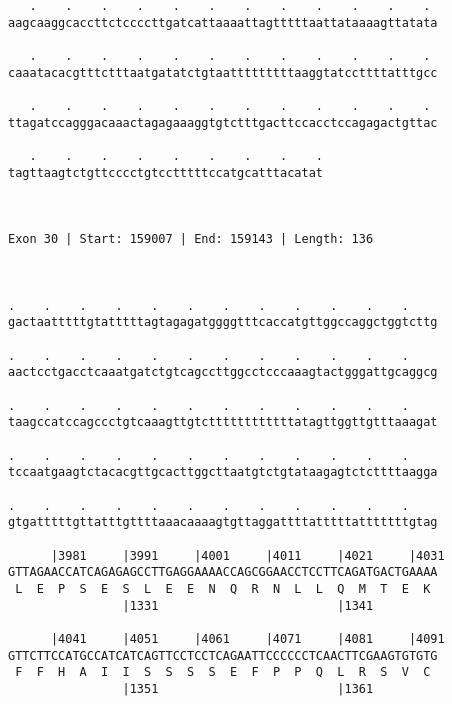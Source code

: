 \documentclass{article}
\begin{document}
\begin{Verbatim}
   .    .    .    .    .    .    .    .    .    .    .    . 
aagcaaggcaccttctccccttgatcattaaaattagtttttaattataaaagttatata
                                                            
   .    .    .    .    .    .    .    .    .    .    .    . 
caaatacacgtttctttaatgatatctgtaatttttttttaaggtatccttttatttgcc
                                                            
   .    .    .    .    .    .    .    .    .    .    .    . 
ttagatccagggacaaactagagaaaggtgtctttgacttccacctccagagactgttac
                                                            
   .    .    .    .    .    .    .    .    .
tagttaagtctgttcccctgtcctttttccatgcatttacatat
                                            
                                            
 
Exon 30 | Start: 159007 | End: 159143 | Length: 136



.    .    .    .    .    .    .    .    .    .    .    .    
gactaatttttgtatttttagtagagatggggtttcaccatgttggccaggctggtcttg
                                                            
.    .    .    .    .    .    .    .    .    .    .    .    
aactcctgacctcaaatgatctgtcagccttggcctcccaaagtactgggattgcaggcg
                                                            
.    .    .    .    .    .    .    .    .    .    .    .    
taagccatccagccctgtcaaagttgtcttttttttttttatagttggttgtttaaagat
                                                            
.    .    .    .    .    .    .    .    .    .    .    .    
tccaatgaagtctacacgttgcacttggcttaatgtctgtataagagtctcttttaagga
                                                            
.    .    .    .    .    .    .    .    .    .    .    .    
gtgatttttgttatttgttttaaacaaaagtgttaggattttatttttatttttttgtag
                                                            
      |3981     |3991     |4001     |4011     |4021     |4031
GTTAGAACCATCAGAGAGCCTTGAGGAAAACCAGCGGAACCTCCTTCAGATGACTGAAAA
 L  E  P  S  E  S  L  E  E  N  Q  R  N  L  L  Q  M  T  E  K 
                |1331                         |1341         
  
      |4041     |4051     |4061     |4071     |4081     |4091
GTTCTTCCATGCCATCATCAGTTCCTCCTCAGAATTCCCCCCTCAACTTCGAAGTGTGTG
 F  F  H  A  I  I  S  S  S  S  E  F  P  P  Q  L  R  S  V  C 
                |1351                         |1361         
  

\end{Verbatim}
\end{document}
